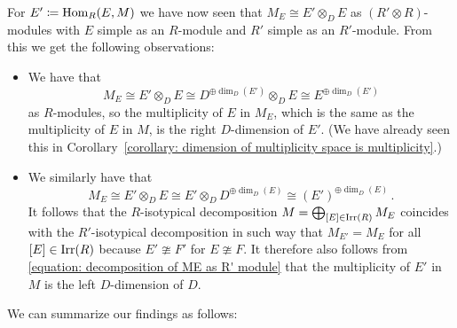 

\begin{fluff}
  For $E' \coloneqq \operatorname{Hom}_R(E,M)$ we have now seen that $M_E \cong E' \otimes_D E$ as $(R' \otimes R)$-modules with $E$ simple as an $R$-module and $R'$ simple as an $R'$-module.
  From this we get the following observations:
  \begin{itemize}
    \item
      We have that
      \[
              M_E
        \cong E' \otimes_D E
        \cong D^{\oplus \dim_D(E')} \otimes_D E
        \cong E^{\oplus \dim_D(E')}
      \]
      as $R$-modules, so the multiplicity of $E$ in $M_E$, which is the same as the multiplicity of $E$ in $M$, is the right $D$-dimension of $E'$.
      (We have already seen this in Corollary~\ref{corollary: dimension of multiplicity space is multiplicity}.)
    \item
      We similarly have that
      \begin{equation}
        \label{equation: decomposition of ME as R' module}
              M_E
        \cong E' \otimes_D E
        \cong E' \otimes_D D^{\oplus \dim_D(E)}
        \cong (E')^{\oplus \dim_D(E)} \,.
      \end{equation}
      It follows that the $R$-isotypical decomposition $M = \bigoplus_{[E] \in \operatorname{Irr}(R)} M_E$ coincides with the $R'$-isotypical decomposition in such way that $M_{E'} = M_E$ for all $[E] \in \operatorname{Irr}(R)$ because $E' \ncong F'$ for $E \ncong F$.
      It therefore also follows from \eqref{equation: decomposition of ME as R' module} that the multiplicity of $E'$ in $M$ is the left $D$-dimension of $D$.
  \end{itemize}
  We can summarize our findings as follows:
\end{fluff}


